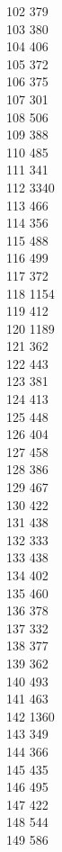 { 102	379 \\
 103	380 \\
 104	406 \\
 105	372 \\
 106	375 \\
 107	301 \\
 108	506 \\
 109	388 \\
 110	485 \\
 111	341 \\
 112	3340 \\
 113	466 \\
 114	356 \\
 115	488 \\
 116	499 \\
 117	372 \\
 118	1154 \\
 119	412 \\
 120	1189 \\
 121	362 \\
 122	443 \\
 123	381 \\
 124	413 \\
 125	448 \\
 126	404 \\
 127	458 \\
 128	386 \\
 129	467 \\
 130	422 \\
 131	438 \\
 132	333 \\
 133	438 \\
 134	402 \\
 135	460 \\
 136	378 \\
 137	332 \\
 138	377 \\
 139	362 \\
 140	493 \\
 141	463 \\
 142	1360 \\
 143	349 \\
 144	366 \\
 145	435 \\
 146	495 \\
 147	422 \\
 148	544 \\
 149	586 \\
}
